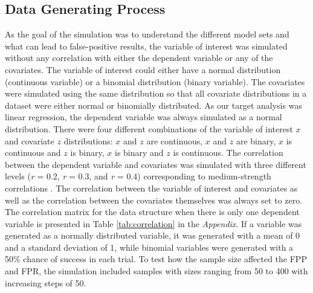 \subsection{Data Generating Process}
As the goal of the simulation was to understand the different model sets and what can lead to false-positive results, the variable of interest was simulated without any correlation with either the dependent variable or any of the covariates. The variable of interest could either have a normal distribution (continuous variable) or a binomial distribution (binary variable). The covariates were simulated using the same distribution so that all covariate distributions in a dataset were either normal or binomially distributed. As our target analysis was linear regression, the dependent variable was always simulated as a normal distribution. There were four different combinations of the variable of interest $x$ and covariate $z$ distributions: $x$ and $z$ are continuous, $x$ and $z$ are binary, $x$ is continuous and $z$ is binary, $x$ is binary and $z$ is continuous. The correlation between the dependent variable and covariates was simulated with three different levels (\textit{r} = 0.2, \textit{r} = 0.3, and \textit{r} = 0.4) corresponding to medium-strength correlations \citep{Cohen1989}. The correlation between the variable of interest and covariates as well as the correlation between the covariates themselves was always set to zero. The correlation matrix for the data structure when there is only one dependent variable is presented in Table \ref{tab:correlation} in the \textit{Appendix}. If a variable was generated as a normally distributed variable, it was generated with a mean of 0 and a standard deviation of 1, while binomial variables were generated with a 50\% chance of success in each trial. To test how the sample size affected the FPP and FPR, the simulation included samples with sizes ranging from 50 to 400 with increasing steps of 50. 

